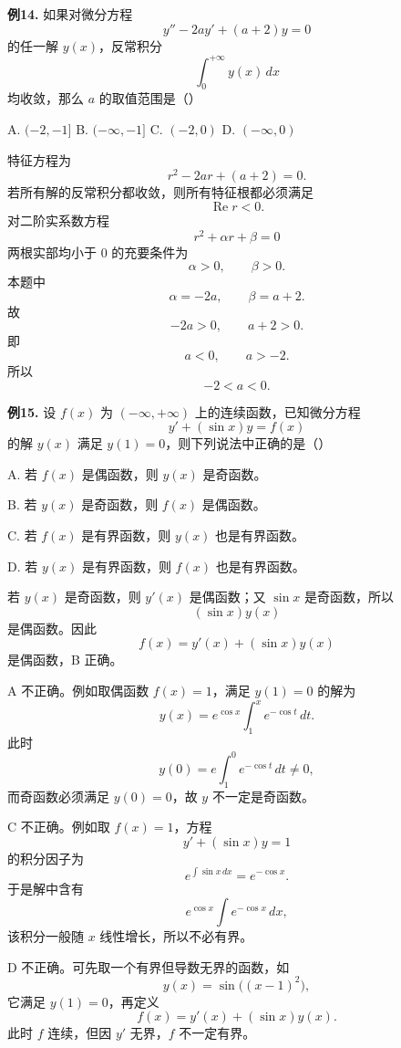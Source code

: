 \begin{problemblock}
\textbf{例14.} 如果对微分方程
\[
y''-2ay'+(a+2)y=0
\]
的任一解 \(y(x)\)，反常积分
\[
\int_0^{+\infty}y(x)\,dx
\]
均收敛，那么 \(a\) 的取值范围是（\quad）

A. \((-2,-1]\)
\quad B. \((-\infty,-1]\)
\quad C. \((-2,0)\)
\quad D. \((-\infty,0)\)
\end{problemblock}
\begin{solutionblock}
特征方程为
\[
r^2-2ar+(a+2)=0.
\]
若所有解的反常积分都收敛，则所有特征根都必须满足
\[
\operatorname{Re}r<0.
\]
对二阶实系数方程
\[
r^2+\alpha r+\beta=0
\]
两根实部均小于 \(0\) 的充要条件为
\[
\alpha>0,\qquad \beta>0.
\]
本题中
\[
\alpha=-2a,\qquad \beta=a+2.
\]
故
\[
-2a>0,\qquad a+2>0.
\]
即
\[
a<0,\qquad a>-2.
\]
所以
\[
-2<a<0.
\]
\end{solutionblock}

\begin{problemblock}
\textbf{例15.} 设 \(f(x)\) 为 \((-\infty,+\infty)\) 上的连续函数，已知微分方程
\[
y'+(\sin x)y=f(x)
\]
的解 \(y(x)\) 满足 \(y(1)=0\)，则下列说法中正确的是（\quad）

A. 若 \(f(x)\) 是偶函数，则 \(y(x)\) 是奇函数。

B. 若 \(y(x)\) 是奇函数，则 \(f(x)\) 是偶函数。

C. 若 \(f(x)\) 是有界函数，则 \(y(x)\) 也是有界函数。

D. 若 \(y(x)\) 是有界函数，则 \(f(x)\) 也是有界函数。
\end{problemblock}
\begin{solutionblock}
若 \(y(x)\) 是奇函数，则 \(y'(x)\) 是偶函数；又 \(\sin x\) 是奇函数，所以
\[
(\sin x)y(x)
\]
是偶函数。因此
\[
f(x)=y'(x)+(\sin x)y(x)
\]
是偶函数，B 正确。

A 不正确。例如取偶函数 \(f(x)=1\)，满足 \(y(1)=0\) 的解为
\[
y(x)=e^{\cos x}\int_1^x e^{-\cos t}\,dt.
\]
此时
\[
y(0)=e\int_1^0e^{-\cos t}\,dt\ne0,
\]
而奇函数必须满足 \(y(0)=0\)，故 \(y\) 不一定是奇函数。

C 不正确。例如取 \(f(x)=1\)，方程
\[
y'+(\sin x)y=1
\]
的积分因子为
\[
e^{\int\sin x\,dx}=e^{-\cos x}.
\]
于是解中含有
\[
e^{\cos x}\int e^{-\cos x}\,dx,
\]
该积分一般随 \(x\) 线性增长，所以不必有界。

D 不正确。可先取一个有界但导数无界的函数，如
\[
y(x)=\sin\bigl((x-1)^2\bigr),
\]
它满足 \(y(1)=0\)，再定义
\[
f(x)=y'(x)+(\sin x)y(x).
\]
此时 \(f\) 连续，但因 \(y'\) 无界，\(f\) 不一定有界。
\end{solutionblock}


